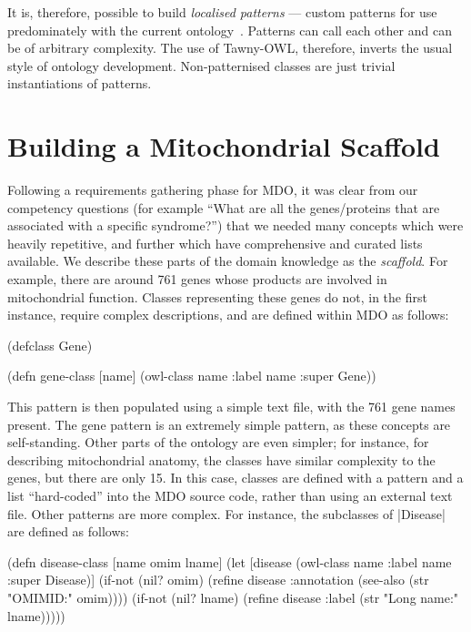\documentclass{icbo}
\newcommand{\tawny}{Tawny-OWL\xspace}
\begin{document}
It is, therefore, possible to build \textit{localised patterns} ---
custom patterns for use predominately with the current
ontology~\citep{warrender_thesis_2015}. Patterns can call each other
and can be of arbitrary complexity. The use of \tawny, therefore,
inverts the usual style of ontology development. Non-patternised
classes are just trivial instantiations of patterns.

\section{Building a Mitochondrial Scaffold}
\label{sec:build-mitoch-scaff}

Following a requirements gathering phase for MDO, it was clear from
our competency questions (for example ``What are all the genes/proteins
that are associated with a specific syndrome?'') that we needed many
concepts which were heavily repetitive, and further which have
comprehensive and curated lists available. We describe these parts of
the domain knowledge as the \textit{scaffold}. For example, there are
around 761 genes whose products are involved in mitochondrial
function. Classes representing these genes do not, in the first
instance, require complex descriptions, and are defined within MDO as
follows:

\begin{tcode}
(defclass Gene)

(defn gene-class [name]
 (owl-class name :label name :super Gene))
\end{tcode}

This pattern is then populated using a simple text file, with the 761
gene names present. The gene pattern is an extremely simple pattern,
as these concepts are self-standing. Other parts of the ontology are
even simpler; for instance, for describing mitochondrial anatomy, the
classes have similar complexity to the genes, but there are only
15. In this case, classes are defined with a pattern and a list
``hard-coded'' into the MDO source code, rather than using an external
text file. Other patterns are more complex. For instance, the
subclasses of |Disease| are defined as follows:



\begin{tcode}
(defn disease-class [name omim lname]
 (let [disease
       (owl-class name
                  :label name
                  :super Disease)]
  (if-not (nil? omim)
   (refine disease
           :annotation 
           (see-also 
            (str "OMIMID:" omim))))
  (if-not (nil? lname)
   (refine disease
           :label 
           (str "Long name:" lname)))))
\end{tcode}
               
\end{document}
